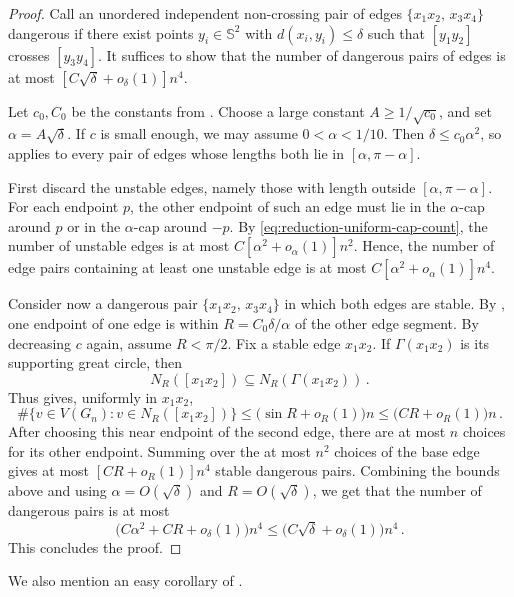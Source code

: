 \documentclass[reqno, 11pt]{amsart}
\theoremstyle{definition}
\begin{document}
\begin{proof}
Call an unordered independent non-crossing pair of edges \(\{x_1x_2,\,x_3x_4\}\) dangerous if there exist points $y_i \in {\mathbb S}^2$ with $d(x_i, y_i) \leq \delta$ such that  \([y_1y_2]\) crosses \([y_3y_4]\).  It suffices to show that the number of dangerous pairs of edges  is at most $[C\sqrt{\delta} +o_\delta(1)]n^4$. 

Let \(c_0,C_0\) be the constants from .  Choose a large constant \(A\ge 1/\sqrt{c_0}\), and set $\alpha=A\sqrt{\delta}.$ If \(c\) is small enough, we may assume \(0<\alpha<1/10\).  Then \(\delta\le c_0\alpha^2\), so  applies to every pair of edges whose lengths both lie in \([\alpha,\pi-\alpha]\).

First discard the unstable edges, namely those with length outside \([\alpha,\pi-\alpha]\).  For each endpoint $p$, the other endpoint of such an edge must lie in the \(\alpha\)-cap around \(p\) or in the \(\alpha\)-cap around \(-p\).  By  \eqref{eq:reduction-uniform-cap-count}, the number of unstable edges is at most $C[\alpha^2+o_\alpha(1)]n^2$. Hence, the number of edge pairs containing at least one unstable edge is at most $C[\alpha^2+o_\alpha(1)]n^4.$

Consider now a dangerous pair \(\{x_1x_2, \, x_3x_4\}\) in which both edges are stable.  By , one endpoint of one edge is within $R = C_0 \delta / \alpha$ of the other edge segment.  By decreasing \(c\) again, assume \(R<\pi/2\).  Fix a stable edge \(x_1x_2\).  If \(\Gamma({x_1x_2})\) is its supporting great circle, then
\[
        N_R([x_1x_2])\subseteq N_R(\Gamma({x_1x_2}))\,.
\]
Thus  gives, uniformly in \(x_1x_2\),
\[
        \#\{v\in V(G_n):v\in N_R([x_1x_2])\}
        \le
        \bigl(\sin R+o_R(1)\bigr)n
        \le
        \bigl(CR+o_R(1)\bigr)n\,.
\]
After choosing this near endpoint of the second edge, there are at most \(n\) choices for its other endpoint.  Summing over the at most \(n^2\) choices of the base edge gives at most $[CR + o_R(1)]n^4$ stable dangerous pairs. Combining the bounds above and using \(\alpha=O(\sqrt{\delta})\) and \(R=O(\sqrt{\delta})\), we get that the number of dangerous pairs is at most
\[        \bigl(C\alpha^2+CR+o_\delta(1)\bigr)n^4
        \le
        \bigl(C\sqrt{\delta}+o_\delta(1)\bigr)n^4\,.
\]
This concludes the proof.
\end{proof}

We also mention an easy corollary of .
\end{document}

